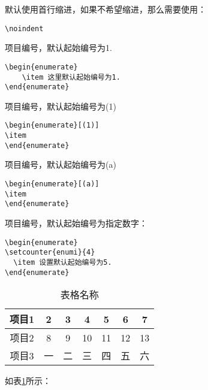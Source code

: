 \documentclass[10pt,onecolumn,a4paper]{article}
\begin{document}
默认使用首行缩进，如果不希望缩进，那么需要使用：
\begin{mdframed}[backgroundcolor=mycolor,hidealllines=true]
\begin{verbatim}
\noindent
\end{verbatim}
\end{mdframed}

项目编号，默认起始编号为1.
\begin{mdframed}[backgroundcolor=mycolor,hidealllines=true]
\begin{verbatim}
\begin{enumerate}
    \item 这里默认起始编号为1.
\end{enumerate}
\end{verbatim}
\end{mdframed}

项目编号，默认起始编号为(1)
\begin{mdframed}[backgroundcolor=mycolor,hidealllines=true]
\begin{verbatim}
\begin{enumerate}[(1)]
\item
\end{enumerate}
\end{verbatim}
\end{mdframed}


项目编号，默认起始编号为(a)
\begin{mdframed}[backgroundcolor=mycolor,hidealllines=true]
\begin{verbatim}
\begin{enumerate}[(a)]
\item
\end{enumerate}
\end{verbatim}
\end{mdframed}


项目编号，默认起始编号为指定数字：
\begin{mdframed}[backgroundcolor=mycolor,hidealllines=true]
\begin{verbatim}
\begin{enumerate}
\setcounter{enumi}{4}
  \item 设置默认起始编号为5.
\end{enumerate}
\end{verbatim}
\end{mdframed}


\begin{table}[!hbp]
  \centering
  \begin{tabular}{|c|c|c|c|c|c|c|}
  \hline
  项目1 & 2 & 3 & 4 & 5 & 6 & 7 \\ \hline
  项目2 & 8 & 9 & 10 & 11 & 12 & 13 \\ \hline
  项目3 & 一 & 二 & 三 & 四 & 五 & 六 \\ \hline
\end{tabular}
  \caption{表格名称}\label{表格标签}
\end{table}
如表\ref{表格标签}所示：
\end{document}
